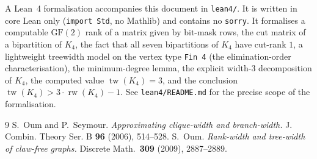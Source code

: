 \documentclass[11pt]{article}
\theoremstyle{definition}
\theoremstyle{remark}
\newcommand{\rw}{\operatorname{rw}}
\newcommand{\tw}{\operatorname{tw}}
\begin{document}
A Lean~4 formalisation accompanies this document in \texttt{lean4/}. It is
written in core Lean only (\texttt{import Std}, no Mathlib) and contains no
\texttt{sorry}. It formalises a computable $\mathrm{GF}(2)$ rank of a matrix
given by bit-mask rows, the cut matrix of a bipartition of $K_4$, the fact
that all seven bipartitions of $K_4$ have cut-rank $1$, a lightweight treewidth
model on the vertex type \texttt{Fin 4} (the elimination-order
characterisation), the minimum-degree lemma, the explicit width-$3$
decomposition of $K_4$, the computed value $\tw(K_4)=3$, and the conclusion
$\tw(K_4) > 3\cdot\rw(K_4) - 1$. See \texttt{lean4/README.md} for the precise
scope of the formalisation.

\begin{thebibliography}{9}
 S.~Oum and P.~Seymour.
\emph{Approximating clique-width and branch-width.}
J. Combin. Theory Ser. B \textbf{96} (2006), 514--528.
 S.~Oum.
\emph{Rank-width and tree-width of claw-free graphs.}
Discrete Math.\ \textbf{309} (2009), 2887--2889.
\end{thebibliography}
\end{document}
